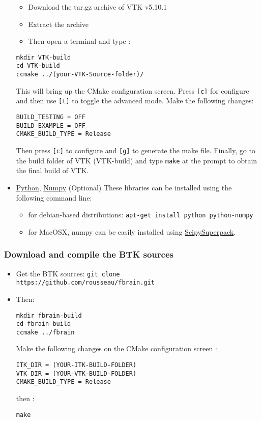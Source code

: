 \documentclass[a4paper,10pt]{article}
\begin{document}
\begin{itemize}
\begin{itemize}
 \item Download the tar.gz archive of VTK v5.10.1
 \item Extract the archive 
 \item Then open a terminal and type :
 \end{itemize}
\begin{verbatim}
mkdir VTK-build
cd VTK-build
ccmake ../(your-VTK-Source-folder)/
\end{verbatim}
This will bring up the CMake configuration screen. Press \texttt{[c]} for
configure and then use \texttt{[t]} to toggle the advanced mode. Make the
following changes:
\begin{verbatim}
BUILD_TESTING = OFF
BUILD_EXAMPLE = OFF
CMAKE_BUILD_TYPE = Release

\end{verbatim}

Then press \texttt{[c]} to configure and \texttt{[g]} to generate the make file.
Finally, go to the build folder of VTK (VTK-build) and type \texttt{make} at the prompt to obtain the final build of VTK.
 \item \href{http://www.python.org/}{Python}, \href{http://numpy.scipy.org/}{Numpy} (Optional)
 These libraries can be installed using the following command line:
 \begin{itemize}
     \item for debian-based distributions: \texttt{apt-get install python python-numpy}
     \item for MacOSX, numpy can be easily installed using \href{http://fonnesbeck.github.com/ScipySuperpack/}{ScipySuperpack}.
 \end{itemize}
\end{itemize}

\subsubsection{Download and compile the BTK sources}
\begin{itemize}
 \item Get the BTK sources: \texttt{git clone https://github.com/rousseau/fbrain.git }
 \item Then:
\begin{verbatim}
mkdir fbrain-build
cd fbrain-build
ccmake ../fbrain
\end{verbatim}
Make the following changes on the CMake configuration screen :
\begin{verbatim}
ITK_DIR = (YOUR-ITK-BUILD-FOLDER)
VTK_DIR = (YOUR-VTK-BUILD-FOLDER)
CMAKE_BUILD_TYPE = Release
\end{verbatim}
then :
\begin{verbatim}
make
\end{verbatim}
\end{itemize}
\end{document}
